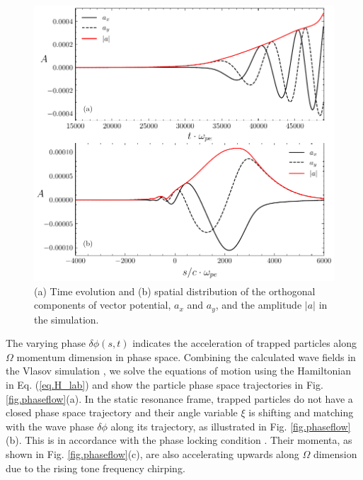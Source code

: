 \begin{figure}
    \centering
    \includegraphics[scale=0.5]{img/aanda.pdf}
    \caption{(a) Time evolution and (b) spatial distribution of the orthogonal components of vector potential, $a_x$ and $a_y$, and the amplitude $|a|$ in the simulation.
    \label{fig.aanda}
    }
\end{figure}


The varying phase $\delta \phi(s,t)$ indicates the acceleration of trapped particles along $\Omega$ momentum dimension in phase space.
Combining the calculated wave fields  in the Vlasov simulation \cite{zheng2024}, we solve the equations of motion using the Hamiltonian in Eq. (\ref{eq.H_lab}) and show the particle phase space trajectories in Fig. \ref{fig.phaseflow}(a). 
In the static resonance frame, trapped particles do not have a closed phase space trajectory and  their angle variable $\xi$  is shifting and matching with the wave phase $\delta \phi$ along its trajectory, as illustrated in Fig. \ref{fig.phaseflow}(b). This is in accordance with the phase locking condition \cite{tao_trap-release-amplify_2021}.
Their momenta, as shown in Fig. \ref{fig.phaseflow}(c), are also accelerating upwards along $\Omega$ dimension due to the rising tone frequency chirping.

